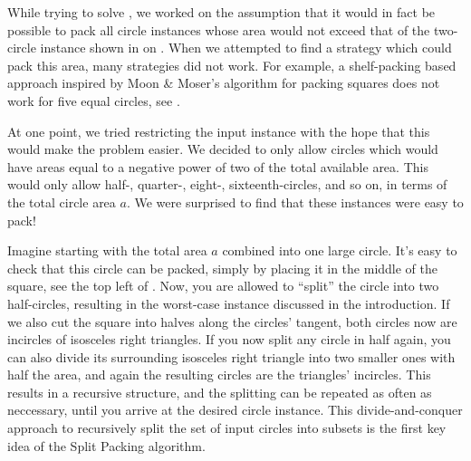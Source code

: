 \documentclass[a4paper,style=print,oneside,bibliography=totoc,nexus,lnum,extramargin]{tubsbook}
\begin{document}
While trying to solve , we worked on the assumption that it would in fact be possible to pack all circle instances whose area would not exceed that of the two-circle instance shown in  on .
When we attempted to find a strategy which could pack this area, many strategies did not work. For example, a shelf-packing based approach inspired by Moon \& Moser's algorithm for packing squares does not work for five equal circles, see .


At one point, we tried restricting the input instance with the hope that this would make the problem easier. We decided to only allow circles which would have areas equal to a negative power of two of the total available area. This would only allow half-, quarter-, eight-, sixteenth-circles, and so on, in terms of the total circle area $a$. We were surprised to find that these instances were easy to pack!

Imagine starting with the total area $a$ combined into one large circle. It's easy to check that this circle can be packed, simply by placing it in the middle of the square, see the top left of . Now, you are allowed to “split” the circle into two half-circles, resulting in the worst-case instance discussed in the introduction. If we also cut the square into halves along the circles' tangent, both circles now are incircles of isosceles right triangles.
If you now split any circle in half again, you can also divide its surrounding isosceles right triangle into two smaller ones with half the area, and again the resulting circles are the triangles' incircles.
This results in a recursive structure, and the splitting can be repeated as often as neccessary, until you arrive at the desired circle instance. This divide-and-conquer approach to recursively split the set of input circles into subsets is the first key idea of the Split Packing algorithm.

\end{document}
